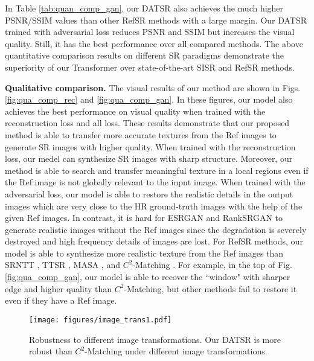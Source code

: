 \documentclass[runningheads]{llncs}
\begin{document}
In Table \ref{tab:quan_comp_gan}, our DATSR also achieves the much higher PSNR/SSIM values than other RefSR methods with a large margin.
Our DATSR trained with adversarial loss reduces PSNR and SSIM but increases the visual quality. Still, it has the best performance over all compared methods.
The above quantitative comparison results on different SR paradigms demonstrate the superiority of our Transformer over state-of-the-art SISR and RefSR methods.


\noindent\textbf{Qualitative comparison.}
The visual results of our method are shown in Figs. \ref{fig:qua_comp_rec} and \ref{fig:qua_comp_gan}.
In these figures, our model also achieves the best performance on visual quality when trained with the reconstruction loss and all loss.
These results demonstrate that our proposed method is able to transfer more accurate textures from the Ref images to generate SR images with higher quality.
When trained with the reconstruction loss, our medel can synthesize SR images with sharp structure.
Moreover, our method is able to search and transfer meaningful texture in a local regions even if the Ref image is not globally relevant to the input image.
When trained with the adversarial loss, our model is able to restore the realistic details in the output images which are very close to the HR ground-truth images with the help of the given Ref images.
In contrast, it is hard for ESRGAN and RankSRGAN to generate realistic images without the Ref images since the degradation is severely destroyed and high frequency details of images are lost.
For RefSR methods, our model is able to synthesize more realistic texture from the Ref images than SRNTT \cite{zhang2019image}, TTSR \cite{yang2020learning}, MASA \cite{lu2021masa}, and $C^2$-Matching \cite{jiang2021robust}.
For example, in the top of Fig. \ref{fig:qua_comp_gan}, our model is able to recover the ``window" with sharper edge and higher quality than $C^2$-Matching, but other methods fail to restore it even if they have a Ref image. 


\begin{figure*}[!t]
    \setlength\belowcaptionskip{-5pt}
    \setlength\abovecaptionskip{-1pt}
\texttt{[image: figures/image\_trans1.pdf]}
	\caption{Robustness to different image transformations. Our DATSR is more robust than $C^2$-Matching \cite{jiang2021robust} under different image transformations.}
	\label{fig:image_trans}
\end{figure*}
\end{document}

